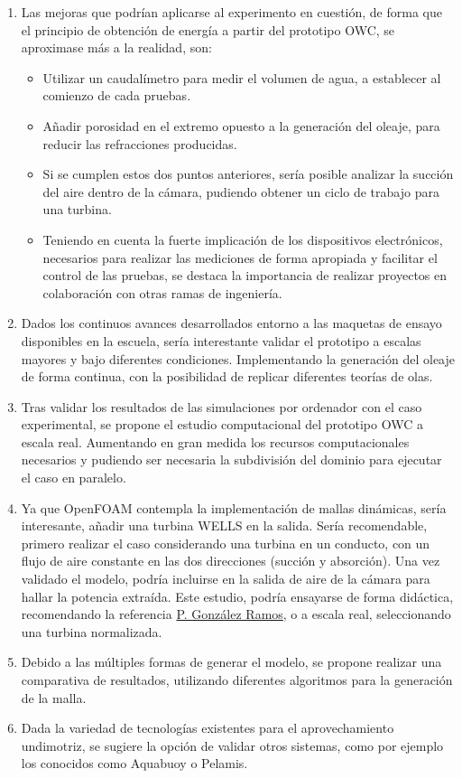 \begin{enumerate}
\def\labelenumi{\arabic{enumi}.}
\item
  Las mejoras que podrían aplicarse al experimento en cuestión, de forma
  que el principio de obtención de energía a partir del prototipo OWC,
  se aproximase más a la realidad, son:

  \begin{itemize}
  \item
    Utilizar un caudalímetro para medir el volumen de agua, a establecer
    al comienzo de cada pruebas.
  \item
    Añadir porosidad en el extremo opuesto a la generación del oleaje,
    para reducir las refracciones producidas.
  \item
    Si se cumplen estos dos puntos anteriores, sería posible analizar la
    succión del aire dentro de la cámara, pudiendo obtener un ciclo de
    trabajo para una turbina.
  \item
    Teniendo en cuenta la fuerte implicación de los dispositivos
    electrónicos, necesarios para realizar las mediciones de forma
    apropiada y facilitar el control de las pruebas, se destaca la
    importancia de realizar proyectos en colaboración con otras ramas de
    ingeniería.
  \end{itemize}
\item
  Dados los continuos avances desarrollados entorno a las maquetas de
  ensayo disponibles en la escuela, sería interestante validar el
  prototipo a escalas mayores y bajo diferentes condiciones.
  Implementando la generación del oleaje de forma continua, con la
  posibilidad de replicar diferentes teorías de olas.
\item
  Tras validar los resultados de las simulaciones por ordenador con el
  caso experimental, se propone el estudio computacional del prototipo
  OWC a escala real. Aumentando en gran medida los recursos
  computacionales necesarios y pudiendo ser necesaria la subdivisión del
  dominio para ejecutar el caso en paralelo.
\item
  Ya que OpenFOAM contempla la implementación de mallas dinámicas, sería
  interesante, añadir una turbina WELLS en la salida. Sería
  recomendable, primero realizar el caso considerando una turbina en un
  conducto, con un flujo de aire constante en las dos direcciones
  (succión y absorción). Una vez validado el modelo, podría incluirse en
  la salida de aire de la cámara para hallar la potencia extraída. Este
  estudio, podría ensayarse de forma didáctica, recomendando la
  referencia
  \href{https://repository.unimilitar.edu.co/bitstream/10654/6683/2/GonzalezRamosPaola2010.pdf}{P.
  González Ramos}, o a escala real, seleccionando una turbina
  normalizada.
\item
  Debido a las múltiples formas de generar el modelo, se propone
  realizar una comparativa de resultados, utilizando diferentes
  algoritmos para la generación de la malla.
\item
  Dada la variedad de tecnologías existentes para el aprovechamiento
  undimotriz, se sugiere la opción de validar otros sistemas, como por
  ejemplo los conocidos como Aquabuoy o Pelamis.
\end{enumerate}
